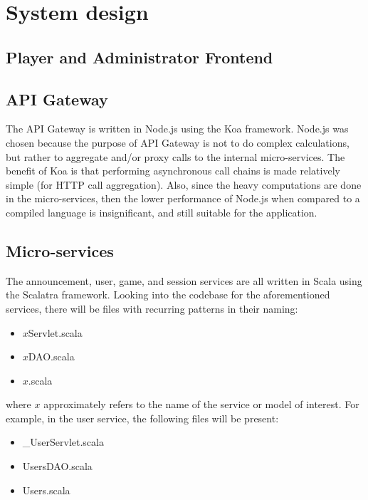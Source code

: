 \documentclass{article}
\begin{document}
\section{System design}

\subsection{Player and Administrator Frontend}

\subsection{API Gateway}
The API Gateway is written in Node.js using the Koa framework. Node.js was chosen because the purpose of API Gateway is not to do complex calculations, but rather to aggregate and/or proxy calls to the internal micro-services. The benefit of Koa is that performing asynchronous call chains is made relatively simple (for HTTP call aggregation). Also, since the heavy computations are done in the micro-services, then the lower performance of Node.js when compared to a compiled language is insignificant, and still suitable for the application.

\subsection{Micro-services}
The announcement, user, game, and session services are all written in Scala using the Scalatra framework. Looking into the codebase for the aforementioned services, there will be files with recurring patterns in their naming:

\begin{itemize}
  \item $x$Servlet.scala
  \item $x$DAO.scala
  \item $x$.scala
\end{itemize}

where $x$ approximately refers to the name of the service or model of interest. For example, in the user service, the following files will be present:

\begin{itemize}
  \item \_UserServlet.scala
  \item UsersDAO.scala
  \item Users.scala
\end{itemize}
\end{document}
